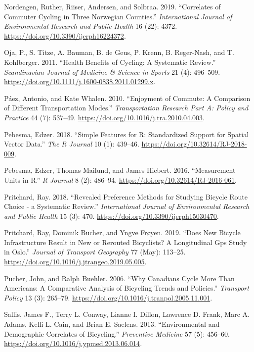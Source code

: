 \documentclass[smallextended]{svjour3}       %
\begin{document}
\leavevmode\hypertarget{ref-Nordengen2019}{}%
Nordengen, Ruther, Riiser, Andersen, and Solbraa. 2019. ``Correlates of
Commuter Cycling in Three Norwegian Counties.'' \emph{International
Journal of Environmental Research and Public Health} 16 (22): 4372.
\url{https://doi.org/10.3390/ijerph16224372}.

\leavevmode\hypertarget{ref-Oja2011}{}%
Oja, P., S. Titze, A. Bauman, B. de Geus, P. Krenn, B. Reger-Nash, and
T. Kohlberger. 2011. ``Health Benefits of Cycling: A Systematic
Review.'' \emph{Scandinavian Journal of Medicine \& Science in Sports}
21 (4): 496--509.
\url{https://doi.org/10.1111/j.1600-0838.2011.01299.x}.

\leavevmode\hypertarget{ref-paezEnjoymentCommuteComparison2010}{}%
Páez, Antonio, and Kate Whalen. 2010. ``Enjoyment of Commute: A
Comparison of Different Transportation Modes.'' \emph{Transportation
Research Part A: Policy and Practice} 44 (7): 537--49.
\url{https://doi.org/10.1016/j.tra.2010.04.003}.

\leavevmode\hypertarget{ref-Pebesma2018}{}%
Pebesma, Edzer. 2018. ``Simple Features for R: Standardized Support for
Spatial Vector Data.'' \emph{The R Journal} 10 (1): 439--46.
\url{https://doi.org/10.32614/RJ-2018-009}.

\leavevmode\hypertarget{ref-Pebesma2016}{}%
Pebesma, Edzer, Thomas Mailund, and James Hiebert. 2016. ``Measurement
Units in R.'' \emph{R Journal} 8 (2): 486--94.
\url{https://doi.org/10.32614/RJ-2016-061}.

\leavevmode\hypertarget{ref-Pritchard2018}{}%
Pritchard, Ray. 2018. ``Revealed Preference Methods for Studying Bicycle
Route Choice - a Systematic Review.'' \emph{International Journal of
Environmental Research and Public Health} 15 (3): 470.
\url{https://doi.org/10.3390/ijerph15030470}.

\leavevmode\hypertarget{ref-Pritchard2019}{}%
Pritchard, Ray, Dominik Bucher, and Yngve Frøyen. 2019. ``Does New
Bicycle Infrastructure Result in New or Rerouted Bicyclists? A
Longitudinal Gps Study in Oslo.'' \emph{Journal of Transport Geography}
77 (May): 113--25. \url{https://doi.org/10.1016/j.jtrangeo.2019.05.005}.

\leavevmode\hypertarget{ref-Pucher2006}{}%
Pucher, John, and Ralph Buehler. 2006. ``Why Canadians Cycle More Than
Americans: A Comparative Analysis of Bicycling Trends and Policies.''
\emph{Transport Policy} 13 (3): 265--79.
\url{https://doi.org/10.1016/j.tranpol.2005.11.001}.

\leavevmode\hypertarget{ref-Sallis2013}{}%
Sallis, James F., Terry L. Conway, Lianne I. Dillon, Lawrence D. Frank,
Marc A. Adams, Kelli L. Cain, and Brian E. Saelens. 2013.
``Environmental and Demographic Correlates of Bicycling.''
\emph{Preventive Medicine} 57 (5): 456--60.
\url{https://doi.org/10.1016/j.ypmed.2013.06.014}.
\end{document}
